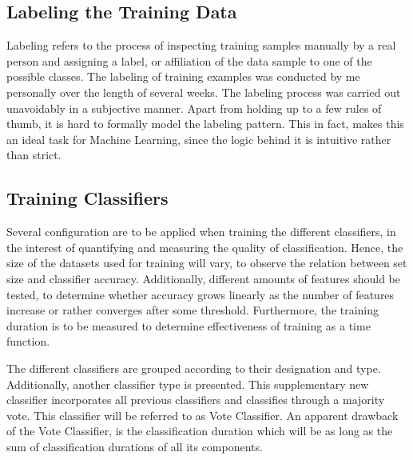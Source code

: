 	\subsection{Labeling the Training Data}
		Labeling refers to the process of inspecting training samples manually by a real person and assigning a label, or affiliation of the data sample to one of the possible classes. The labeling of training examples was conducted by me personally over the length of several weeks. The labeling process was carried out unavoidably in a subjective manner. Apart from holding up to a few rules of thumb, it is hard to formally model the labeling pattern. This in fact, makes this an ideal task for Machine Learning, since the logic behind it is intuitive rather than strict.
			
	\subsection{Training Classifiers}
		Several configuration are to be applied when training the different classifiers, in the interest of quantifying and measuring the quality of classification. Hence, the size of the datasets used for training will vary, to observe the relation between set size and classifier accuracy. Additionally, different amounts of features should be tested, to determine whether accuracy grows linearly as the number of features increase or rather converges after some threshold. Furthermore, the training duration is to be measured to determine effectiveness of training as a time function.
		
		\par
		
		The different classifiers are grouped according to their designation and type. Additionally, another classifier type is presented. This supplementary new classifier incorporates all previous classifiers and classifies through a majority vote. This classifier will be referred to as Vote Classifier. An apparent drawback of the Vote Classifier, is the classification duration which will be as long as the sum of classification durations of all its components.
		
		